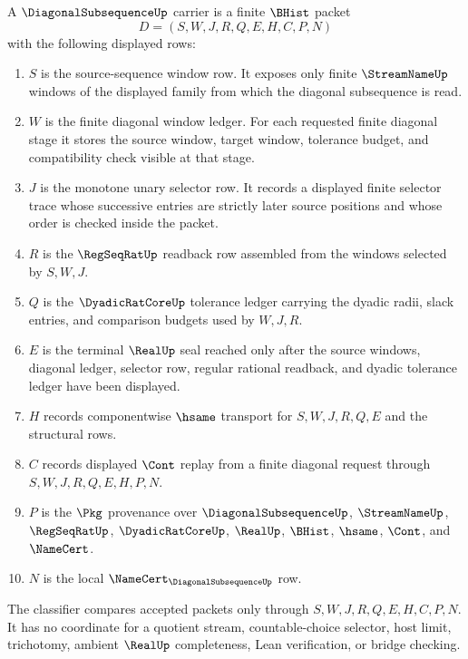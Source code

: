 \begin{definition}
\label{def:diagonal-subsequence-carrier}
A $\DiagonalSubsequenceUp$ carrier is a finite $\BHist$ packet
$$
D=(S,W,J,R,Q,E,H,C,P,N)
$$
with the following displayed rows:
\begin{enumerate}
\item $S$ is the source-sequence window row. It exposes only finite $\StreamNameUp$ windows of the displayed family from which the diagonal subsequence is read.
\item $W$ is the finite diagonal window ledger. For each requested finite diagonal stage it stores the source window, target window, tolerance budget, and compatibility check visible at that stage.
\item $J$ is the monotone unary selector row. It records a displayed finite selector trace whose successive entries are strictly later source positions and whose order is checked inside the packet.
\item $R$ is the $\RegSeqRatUp$ readback row assembled from the windows selected by $S,W,J$.
\item $Q$ is the $\DyadicRatCoreUp$ tolerance ledger carrying the dyadic radii, slack entries, and comparison budgets used by $W,J,R$.
\item $E$ is the terminal $\RealUp$ seal reached only after the source windows, diagonal ledger, selector row, regular rational readback, and dyadic tolerance ledger have been displayed.
\item $H$ records componentwise $\hsame$ transport for $S,W,J,R,Q,E$ and the structural rows.
\item $C$ records displayed $\Cont$ replay from a finite diagonal request through $S,W,J,R,Q,E,H,P,N$.
\item $P$ is the $\Pkg$ provenance over $\DiagonalSubsequenceUp$, $\StreamNameUp$, $\RegSeqRatUp$, $\DyadicRatCoreUp$, $\RealUp$, $\BHist$, $\hsame$, $\Cont$, and $\NameCert$.
\item $N$ is the local $\NameCert_{\DiagonalSubsequenceUp}$ row.
\end{enumerate}
The classifier compares accepted packets only through $S,W,J,R,Q,E,H,C,P,N$. It has no coordinate for a quotient stream, countable-choice selector, host limit, trichotomy, ambient $\RealUp$ completeness, Lean verification, or bridge checking.
\end{definition}

